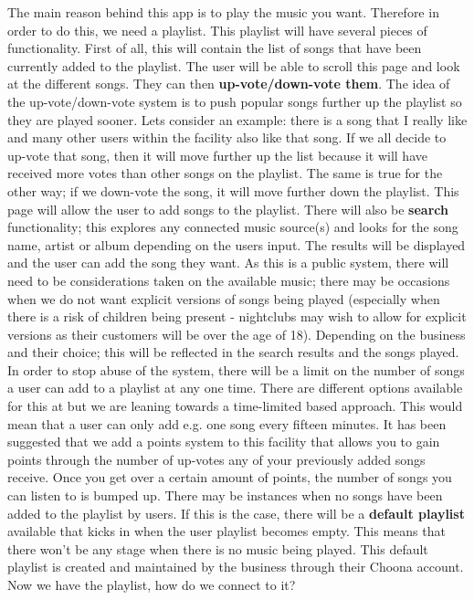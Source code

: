 The main reason behind this app is to play the music you want.  Therefore in order to do this, we need a playlist.   This playlist will have several pieces of functionality.  First of all, this will contain the list of songs that have been currently added to the playlist.  The user will be able to scroll this page and look at the different songs.  They can then \textbf{up-vote/down-vote them}.  The idea of the up-vote/down-vote system is to push popular songs further up the playlist so they are played sooner.  Lets consider an example: there is a song that I really like and many other users within the facility also like that song.  If we all decide to up-vote that song, then it will move further up the list because it will have received more votes than other songs on the playlist.  The same is true for the other way; if we down-vote the song, it will move further down the playlist.  This page will allow the user to add songs to the playlist.  There will also be \textbf{search} functionality; this explores any connected music source(s) and looks for the song name, artist or album depending on the users input.  The results will be displayed and the user can add the song they want.  As this is a public system, there will need to be considerations taken on the available music; there may be occasions when we do not want explicit versions of songs being played (especially when there is a risk of children being present - nightclubs may wish to allow for explicit versions as their customers will be over the age of 18).  Depending on the business and their choice; this will be reflected in the search results and the songs played.\\
In order to stop abuse of the system, there will be a limit on the number of songs a user can add to a playlist at any one time.  There are different options available for this at but we are leaning towards a time-limited based approach.  This would mean that a user can only add e.g. one song every fifteen minutes.  It has been suggested that we add a points system to this facility that allows you to gain points through the number of up-votes any of your previously added songs receive.  Once you get over a certain amount of points, the number of songs you can listen to is bumped up.  
There may be instances when no songs have been added to the playlist by users.  If this is the case, there will be a \textbf{default playlist} available that kicks in when the user playlist becomes empty.  This means that there won't be any stage when there is no music being played.  This default playlist is created and maintained by the business through their Choona account.  Now we have the playlist, how do we connect to it?\\

